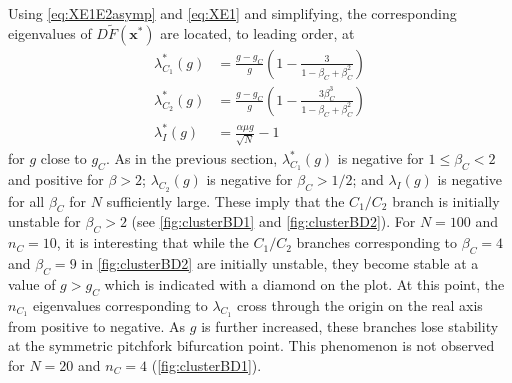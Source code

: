 \documentclass[reqno]{siamonline190516}
\newcommand{\xvec}{\mathbf{x}}
\begin{document}
Using \cref{eq:XE1E2asymp} and \cref{eq:XE1} and simplifying, the corresponding eigenvalues of $D\tilde{F}(\xvec^*)$ are located, to leading order, at
\begin{equation}\label{eq:DFclustereigs}
\begin{aligned}
\lambda_{C_1}^*(g) &= \frac{g-g_C}{g} \left( 1 - \frac{3}{1-\beta_C+\beta_C^2 }\right) \\
\lambda_{C_2}^*(g) &= \frac{g-g_C}{g} \left( 1 - \frac{3 \beta_C^3}{1-\beta_C+\beta_C^2 }\right) \\
\lambda_{I}^*(g) &= \frac{\alpha \mu g}{\sqrt{N}} - 1
\end{aligned}
\end{equation}
for $g$ close to $g_C$. As in the previous section, $\lambda_{C_1}^*(g)$ is negative for $1 \leq \beta_C < 2$ and positive for $\beta > 2$; $\lambda_{C_2}(g)$ is negative for $\beta_C  > 1/2$; and $\lambda_{I}(g)$ is negative for all $\beta_C$ for $N$ sufficiently large. These imply that the $C_1/C_2$ branch is initially unstable for $\beta_C > 2$ (see \cref{fig:clusterBD1} and \cref{fig:clusterBD2}). For $N = 100$ and $n_C = 10$, it is interesting that while the $C_1/C_2$ branches corresponding to $\beta_C = 4$ and $\beta_C = 9$ in \cref{fig:clusterBD2} are initially unstable, they become stable at a value of $g > g_C$ which is indicated with a diamond on the plot. At this point, the $n_{C_1}$ eigenvalues corresponding to $\lambda_{C_1}$ cross through the origin on the real axis from positive to negative. As $g$ is further increased, these branches lose stability at the symmetric pitchfork bifurcation point. This phenomenon is not observed for $N=20$ and $n_C=4$ (\cref{fig:clusterBD1}).
\end{document}
